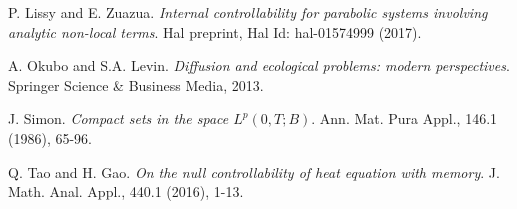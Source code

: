 \documentclass[preprint,1p]{elsarticle}
\begin{document}
\begin{thebibliography}{99}
 P. Lissy and E. Zuazua. \emph{Internal controllability for parabolic systems involving analytic non-local terms}. Hal preprint, Hal Id: hal-01574999 (2017).

 A. Okubo and S.A. Levin. \emph{Diffusion and ecological problems: modern perspectives}. Springer Science \& Business Media, 2013.

 J. Simon. \emph{Compact sets in the space $L^p(0,T;B)$}. Ann. Mat. Pura Appl., 146.1 (1986), 65-96. 

 Q. Tao and H. Gao. \emph{On the null controllability of heat equation with memory}. J. Math. Anal. Appl., 440.1 (2016), 1-13.
\end{thebibliography}
\end{document}
